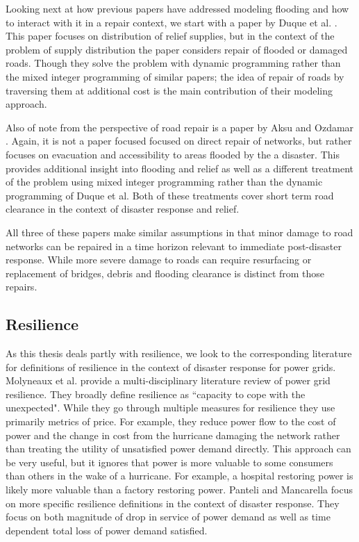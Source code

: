 Looking next at how previous papers have addressed modeling flooding and how to interact with it in a repair context, we start with a paper by Duque et al. \cite{DuqueEA2016}. This paper focuses on distribution of relief supplies, but in the context of the problem of supply distribution the paper considers repair of flooded or damaged roads. Though they solve the problem with dynamic programming rather than the mixed integer programming of similar papers; the idea of repair of roads by traversing them at additional cost is the main contribution of their modeling approach.

Also of note from the perspective of road repair is a paper by Aksu and Ozdamar \cite{AksuEA2014}. Again, it is not a paper focused focused on direct repair of networks, but rather focuses on evacuation and accessibility to areas flooded by the a disaster. This provides additional insight into flooding and relief as well as a different treatment of the problem using mixed integer programming rather than the dynamic programming of Duque et al. Both of these treatments cover short term road clearance in the context of disaster response and relief. 

All three of these papers make similar assumptions in that minor damage to road networks can be repaired in a time horizon relevant to immediate post-disaster response. While more severe damage to roads can require resurfacing or replacement of bridges, debris and flooding clearance is distinct from those repairs.

\subsection{Resilience}
As this thesis deals partly with resilience, we look to the corresponding literature for definitions of resilience in the context of disaster response for power grids. Molyneaux et al. \cite{MolyneauxEA2016} provide a multi-disciplinary literature review of power grid resilience. They broadly define resilience as ``capacity to cope with the unexpected". While they go through multiple measures for resilience they use primarily metrics of price. For example, they reduce power flow to the cost of power and the change in cost from the hurricane damaging the network rather than treating the utility of unsatisfied power demand directly. This approach can be very useful, but it ignores that power is more valuable to some consumers than others in the wake of a hurricane. For example, a hospital restoring power is likely more valuable than a factory restoring power. Panteli and Mancarella \cite{Panteli2017} focus on more specific resilience definitions in the context of disaster response. They focus on both magnitude of drop in service of power demand as well as time dependent total loss of power demand satisfied.


